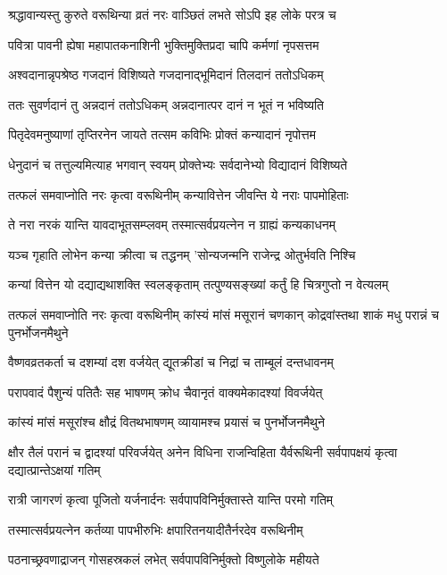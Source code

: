 \twolineshloka
{श्रद्धावान्यस्तु कुरुते वरूथिन्या व्रतं नरः}
{वाञ्छितं लभते सोऽपि इह लोके परत्र च} %

\twolineshloka
{पवित्रा पावनी ह्येषा महापातकनाशिनी}
{भुक्तिमुक्तिप्रदा चापि कर्मणां नृपसत्तम} %

\twolineshloka
{अश्वदानान्नृपश्रेष्ठ गजदानं विशिष्यते}
{गजदानाद्भूमिदानं तिलदानं ततोऽधिकम्} %

\twolineshloka
{ततः सुवर्णदानं तु अन्नदानं ततोऽधिकम्}
{अन्नदानात्पर दानं न भूतं न भविष्यति} %

\twolineshloka
{पितृदेवमनुष्याणां तृप्तिरनेन जायते}
{तत्सम कविभिः प्रोक्तं कन्यादानं नृपोत्तम} %

\twolineshloka
{धेनुदानं च तत्तुल्यमित्याह भगवान् स्वयम्}
{प्रोक्तेभ्यः सर्वदानेभ्यो विद्यादानं विशिष्यते} %

\twolineshloka
{तत्फलं समवाप्नोति नरः कृत्वा वरूथिनीम्}
{कन्यावित्तेन जीवन्ति ये नराः पापमोहिताः} %

\twolineshloka
{ते नरा नरकं यान्ति यावदाभूतसम्प्लवम्}
{तस्मात्सर्वप्रयत्नेन न ग्राह्यं कन्यकाधनम्} %

\twolineshloka
{यञ्च गृहाति लोभेन कन्या क्रीत्वा च तद्धनम्}
{'सोन्यजन्मनि राजेन्द्र ओतुर्भवति निश्चि} %

\twolineshloka
{कन्यां वित्तेन यो दद्याद्यथाशक्ति स्वलङ्कृताम्}
{तत्पुण्यसङ्ख्यां कर्तुं हि चित्रगुप्तो न वेत्यलम्} %


\threelineshloka
{तत्फलं समवाप्नोति नरः कृत्वा वरूथिनीम्}
{कांस्यं मांसं मसूरानं चणकान् कोद्रवांस्तथा}
{शाकं मधु परान्नं च पुनर्भोजनमैथुने} %

\twolineshloka
{वैष्णवव्रतकर्ता च दशम्यां दश वर्जयेत्}
{द्यूतक्रीडां च निद्रां च ताम्बूलं दन्तधावनम्} %

\twolineshloka
{परापवादं पैशुन्यं पतितैः सह भाषणम्}
{क्रोध चैवानृतं वाक्यमेकादश्यां विवर्जयेत्} %

\twolineshloka
{कांस्यं मांसं मसूरांश्च क्षौद्रं वितथभाषणम्}
{व्यायामश्च प्रयासं च पुनर्भोजनमैथुने} %


\threelineshloka
{क्षौर तैलं परानं च द्वादश्यां परिवर्जयेत्}
{अनेन विधिना राजन्विहिता यैर्वरूथिनी}
{सर्वपापक्षयं कृत्वा दद्यात्प्रान्तेऽक्षयां गतिम्} %

\twolineshloka
{रात्री जागरणं कृत्वा पूजितो यर्जनार्दनः}
{सर्वपापविनिर्मुक्तास्ते यान्ति परमो गतिम्} %

\twolineshloka
{तस्मात्सर्वप्रयत्नेन कर्तव्या पापभीरुभिः}
{क्षपारितनयादीतैर्नरदेव वरूथिनीम्} %

\twolineshloka
{पठनाच्छ्रवणाद्राजन् गोसहस्रकलं लभेत्}
{सर्वपापविनिर्मुक्तो विष्णुलोके महीयते} %

